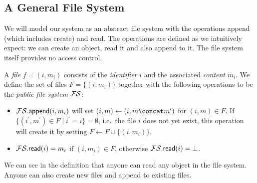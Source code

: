 
\subsection{A General File System}\label{FileSystem}

We will model our system as an abstract file system with the operations append 
(which includes create) and read.
The operations are defined as we intuitively expect: we can create an object, 
read it and also append to it.
The file system itself provides no access control.

\begin{definition}\label{FS}
  A \emph{file} \(f = (i, m_i)\) consists of the \emph{identifier} \(i\) and 
  the associated \emph{content} \(m_i\).
  We define the set of files \(F = \{(i, m_i)\}\) together with the following 
  operations to be the \emph{public file system} \(\FS\):
  \begin{itemize}
    \item \(\fswrite[i][m_i]\) will set \((i, m)\gets (i, m\concat m^\prime)\) 
      for \((i, m)\in F\).
      If \(\{(i^\prime, m^\prime)\in F \mid i^\prime = i\} = \emptyset\), i.e.\ 
      the file \(i\) does not yet exist, this operation will create it by 
      setting \(F\gets F\cup \{(i, m_i)\}\).

    \item \(\fsread[i] = m_i\) if \((i, m_i)\in F\), otherwise \(\fsread[i] 
        = \bot\).

  \end{itemize}
\end{definition}

We can see in the definition that anyone can read any object in the file 
system.
Anyone can also create new files and append to existing files.

%

